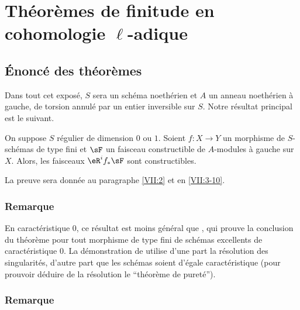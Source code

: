 

\chapter{Théorèmes de finitude en cohomologie \texorpdfstring{$\ell$}{l}-adique}\label{VII}










\section{Énoncé des théorèmes}\label{VII:1}

Dans tout cet exposé, $S$ sera un schéma noethérien et $A$ un anneau 
noethérien à gauche, de torsion annulé par un entier inversible sur $S$. 
Notre résultat principal est le suivant. 





\begin{theorem_}\label{VII:1-1}
On suppose $S$ régulier de dimension $0$ ou $1$. Soient $f:X\to Y$ un 
morphisme de $S$-schémas de type fini et $\sF$ un faisceau constructible de 
$A$-modules à gauche sur $X$. Alors, les faisceaux $\eR^i f_\ast \sF$ sont 
constructibles. 
\end{theorem_}

La preuve sera donnée au paragraphe \ref{VII:2} et en \ref{VII:3-10}. 





\subsection{Remarque}\label{VIII:1-2}

En caractéristique $0$, ce résultat est moins général que 
\cite[XIX paragraphe 5]{sga4}, qui prouve la conclusion du théorème pour 
tout morphisme de type fini de schémas excellents de caractéristique $0$. 
La démonstration de \cite[XIX]{sga4} utilise d'une part la résolution des  
singularités, d'autre part que les schémas soient d'égale 
caractéristique (pour prouvoir déduire de la résolution le ``théorème 
de pureté''). 






\subsection{Remarque}\label{VII:1-3}

